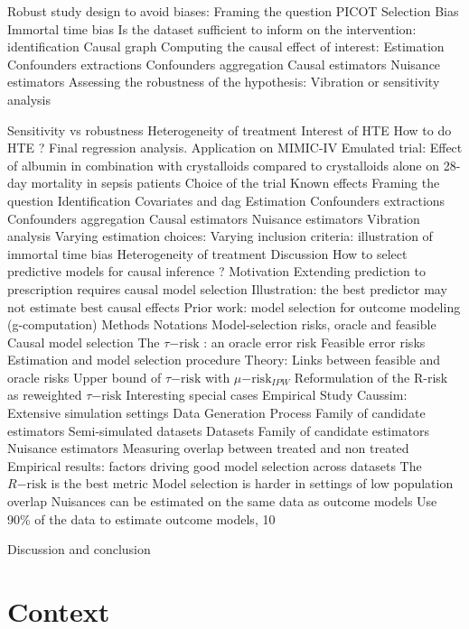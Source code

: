 \documentclass{report}
\begin{document}
Robust study design to avoid biases: Framing the question
PICOT
Selection Bias
Immortal time bias
Is the dataset sufficient to inform on the intervention: identification
Causal graph
Computing the causal effect of interest: Estimation
Confounders extractions
Confounders aggregation
Causal estimators
Nuisance estimators
Assessing the robustness of the hypothesis: Vibration or sensitivity analysis

Sensitivity vs robustness
Heterogeneity of treatment
Interest of HTE
How to do HTE ? Final regression analysis.
Application on MIMIC-IV
Emulated trial: Effect of albumin in combination with crystalloids compared to crystalloids alone on 28-day mortality in sepsis patients
Choice of the trial
Known effects
Framing the question
Identification
Covariates and dag
Estimation
Confounders extractions
Confounders aggregation
Causal estimators
Nuisance estimators
Vibration analysis
Varying estimation choices:
Varying inclusion criteria: illustration of immortal time bias
Heterogeneity of treatment
Discussion
How to select predictive models for causal inference ?
Motivation
Extending prediction to prescription requires causal model selection
Illustration: the best predictor may not estimate best causal effects
Prior work: model selection for outcome modeling (g-computation)
Methods
Notations
Model-selection risks, oracle and feasible
Causal model selection
The $\tau\mathrm{-risk}$ : an oracle error risk
Feasible error risks
Estimation and model selection procedure
Theory: Links between feasible and oracle risks
Upper bound of $\tau\mathrm{-risk}$ with $\mu\mathrm{-risk}_{IPW}$
Reformulation of the R-risk as reweighted $\tau\mathrm{-risk}$
Interesting special cases
Empirical Study
Caussim: Extensive simulation settings
Data Generation Process
Family of candidate estimators
Semi-simulated datasets
Datasets
Family of candidate estimators
Nuisance estimators
Measuring overlap between treated and non treated
Empirical results: factors driving good model selection across datasets
The $R\mathrm{-risk}$ is the best metric
Model selection is harder in settings of low population overlap
Nuisances can be estimated on the same data as outcome models
Use 90\% of the data to estimate outcome models, 10%


Discussion and conclusion






\section{Context}
\end{document}
